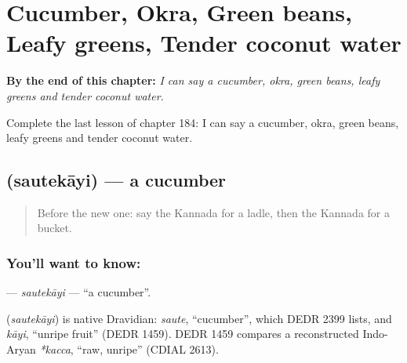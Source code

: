 
\chapter{Cucumber, Okra, Green beans, Leafy greens, Tender coconut water}
\label{ch:ka-cucumber-okra-green-beans-leafy-greens-tender-coconut-water}

\begin{chapteropening}
\textbf{By the end of this chapter:} \emph{I can say a cucumber, okra, green beans, leafy greens and tender coconut water.}

Complete the last lesson of chapter 184: I can say a cucumber, okra, green beans, leafy greens and tender coconut water.
\end{chapteropening}

\section[\texorpdfstring{\kn{ಸೌತೆಕಾಯಿ} (sautekāyi)}{ಸೌತೆಕಾಯಿ (sautekāyi)}]{ (sautekāyi) — a cucumber}

\label{lesson:KA-C184-sautekayi}



\begin{quote}
Before the new one: say the Kannada for a ladle, then the Kannada for a bucket.
\end{quote}

\subsection*{You'll want to know: }
\textbf{} — \emph{sautekāyi} — \textquotedblleft{}a cucumber\textquotedblright{}.

\begin{cousinweb}
\textbf{} (\emph{sautekāyi}) is native Dravidian: \emph{saute}, \textquotedblleft{}cucumber\textquotedblright{}, which DEDR 2399 lists, and \emph{kāyi}, \textquotedblleft{}unripe fruit\textquotedblright{} (DEDR 1459). DEDR 1459 compares a reconstructed Indo-Aryan \emph{*kacca}, \textquotedblleft{}raw, unripe\textquotedblright{} (CDIAL 2613).
\end{cousinweb}

